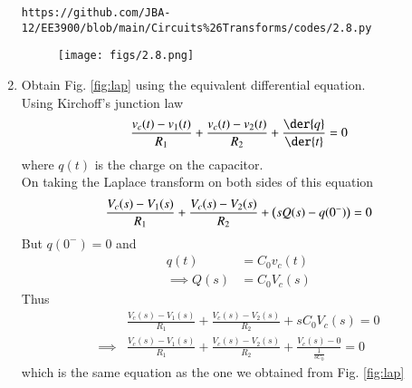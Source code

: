 \documentclass[journal,12pt,twocolumn]{IEEEtran}
\renewcommand\thesection{\arabic{section}}
\begin{document}
\begin{enumerate}[label=\arabic*.,ref=\thesection.\theenumi]
\begin{lstlisting}
\end{lstlisting}
\begin{lstlisting}
https://github.com/JBA-12/EE3900/blob/main/Circuits%26Transforms/codes/2.8.py
\end{lstlisting}
\begin{figure}[!ht]
\centering
\texttt{[image: figs/2.8.png]}
\caption{}
\label{fig:ngspice}
\end{figure}
\item Obtain Fig. 
\ref{fig:lap}
using the equivalent differential equation.\\
\solution Using Kirchoff's junction law
\begin{align}
\frac{v_c(t) - v_1(t)}{R_1} + \frac{v_c(t) - v_2(t)}{R_2} + \frac{\der{q}}{\der{t}} = 0
\end{align}
where $q(t)$ is the charge on the capacitor.\\
On taking the Laplace transform on both sides of this equation
\begin{align}
\frac{V_c(s) - V_1(s)}{R_1} + \frac{V_c(s) - V_2(s)}{R_2} + \left(sQ(s) - q(0^-)\right) = 0
\end{align}
But $q(0^-) = 0$ and 
\begin{align}
q(t) &= C_0v_c(t) \\
\implies Q(s) &= C_0V_c(s)
\end{align}
Thus
\begin{align}
&\frac{V_c(s) - V_1(s)}{R_1} + \frac{V_c(s) - V_2(s)}{R_2} + sC_0V_c(s) = 0 \\
\implies &\frac{V_c(s) - V_1(s)}{R_1} + 	\frac{V_c(s) - V_2(s)}{R_2} + \frac{V_c(s) - 0}{\frac{1}{sC_0}} = 0 
\end{align}
which is the same equation as the one we obtained from Fig. \ref{fig:lap}
\end{enumerate}
\end{document}

